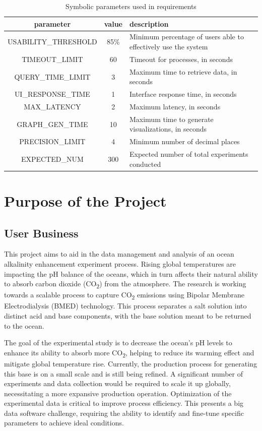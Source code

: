 \documentclass[12pt]{article}
\begin{document}
\begin{table}[htb]
  \caption{Symbolic parameters used in requirements}
  \label{SYM_PAR}
  \centering
  \begin{tabular}{c c p{6cm}}
    \toprule
    \textbf{parameter} & \textbf{value} & \textbf{description}\\
    \midrule 
    USABILITY\_THRESHOLD & 85\% & Minimum percentage of users able to effectively use the system\\
    TIMEOUT\_LIMIT & 60 & Timeout for processes, in seconds\\
    QUERY\_TIME\_LIMIT & 3 & Maximum time to retrieve data, in seconds\\
    UI\_RESPONSE\_TIME & 1 & Interface response time, in seconds\\
    MAX\_LATENCY & 2 & Maximum latency, in seconds\\
    GRAPH\_GEN\_TIME & 10 & Maximum time to generate visualizations, in
    seconds\\
    PRECISION\_LIMIT & 4 & Minimum number of decimal places\\
    EXPECTED\_NUM & 300 & Expected number of total experiments conducted\\
    \bottomrule
  \end{tabular}
\end{table}

\section{Purpose of the Project}
\subsection{User Business}
This project aims to aid in the data management and analysis of an ocean
alkalinity enhancement experiment process. Rising global temperatures are
impacting the pH balance of the oceans, which in turn affects their natural
ability to absorb carbon dioxide (CO\textsubscript{2}) from the atmosphere. The
research is working towards a scalable process to capture CO\textsubscript{2}
emissions using Bipolar Membrane Electrodialysis (BMED) technology. This process
separates a salt solution into distinct acid and base components, with the base
solution meant to be returned to the ocean.

\noindent The goal of the experimental study is to decrease the ocean's pH
levels to enhance its ability to absorb more CO\textsubscript{2}, helping to
reduce its warming effect and mitigate global temperature rise. Currently, the
production process for generating this base is on a small scale and is
still being refined. A significant number of experiments and data collection
would be required to scale it up globally, necessitating a more expansive
production operation. Optimization of the experimental data is critical to
improve process efficiency. This presents a big data software challenge,
requiring the ability to identify and fine-tune specific parameters to achieve
ideal conditions.
\end{document}
